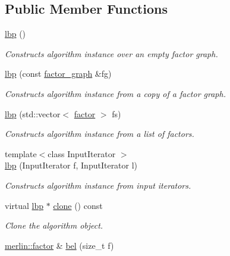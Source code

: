\subsection*{Public Member Functions}
\begin{DoxyCompactItemize}
\item 
\hypertarget{classmerlin_1_1lbp_aec902b835fbb159f872a9101cd007b7e}{}\hyperlink{classmerlin_1_1lbp_aec902b835fbb159f872a9101cd007b7e}{lbp} ()\label{classmerlin_1_1lbp_aec902b835fbb159f872a9101cd007b7e}

\begin{DoxyCompactList}\small\item\em Constructs algorithm instance over an empty factor graph. \end{DoxyCompactList}\item 
\hyperlink{classmerlin_1_1lbp_a46fbc09692ece741ba66da1a36b84fb3}{lbp} (const \hyperlink{classmerlin_1_1factor__graph}{factor\+\_\+graph} \&fg)
\begin{DoxyCompactList}\small\item\em Constructs algorithm instance from a copy of a factor graph. \end{DoxyCompactList}\item 
\hyperlink{classmerlin_1_1lbp_a5caa6f3d93015569031933bbce944aa4}{lbp} (std\+::vector$<$ \hyperlink{classmerlin_1_1factor}{factor} $>$ fs)
\begin{DoxyCompactList}\small\item\em Constructs algorithm instance from a list of factors. \end{DoxyCompactList}\item 
{\footnotesize template$<$class Input\+Iterator $>$ }\\\hyperlink{classmerlin_1_1lbp_ad4c9c7ba780848817d9f49e2e7537fb3}{lbp} (Input\+Iterator f, Input\+Iterator l)
\begin{DoxyCompactList}\small\item\em Constructs algorithm instance from input iterators. \end{DoxyCompactList}\item 
virtual \hyperlink{classmerlin_1_1lbp}{lbp} $\ast$ \hyperlink{classmerlin_1_1lbp_a4d2e317106a40ca49074f898a7a46fb0}{clone} () const 
\begin{DoxyCompactList}\small\item\em Clone the algorithm object. \end{DoxyCompactList}\item 
\hypertarget{classmerlin_1_1lbp_a35585f32c077c507ed3582ee72d9e0d1}{}\hyperlink{classmerlin_1_1factor}{merlin\+::factor} \& \hyperlink{classmerlin_1_1lbp_a35585f32c077c507ed3582ee72d9e0d1}{bel} (size\+\_\+t f)\label{classmerlin_1_1lbp_a35585f32c077c507ed3582ee72d9e0d1}


\end{DoxyCompactItemize}
